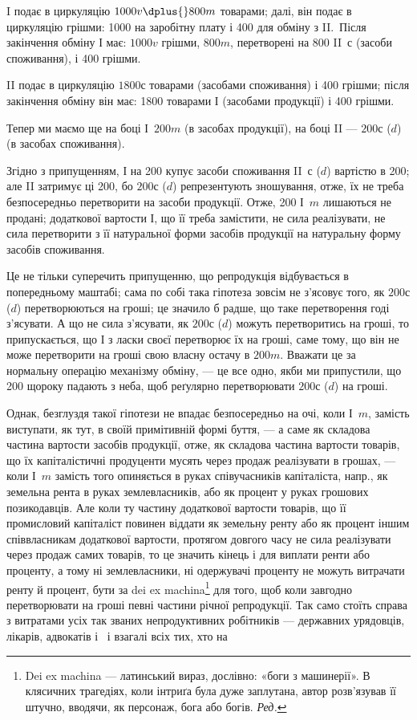 
I подає в циркуляцію $1000 v \dplus{} 800 m$ товарами; далі, він подає
в циркуляцію грішми: 1000 на заробітну плату і 400
для обміну з II.~Після закінчення обміну І має: $1000 v$ грішми, $800 m$,
перетворені на 800 II~$с$ (засоби споживання), і 400 грішми.

II подає в циркуляцію $1800 с$ товарами (засобами споживання) і
400 грішми; після закінчення обміну він має: 1800 товарами І
(засобами продукції) і 400 грішми.

Тепер ми маємо ще на боці І~$200 m$ (в засобах продукції), на боці
II — $200 с$ ($d$) (в засобах споживання).

Згідно з припущенням, І на 200 купує засоби споживання
II~$с$ ($d$) вартістю в 200; але II затримує ці 200, бо $200 с$ ($d$)
репрезентують зношування, отже, їх не треба безпосередньо перетворити
на засоби продукції. Отже, 200 І~$m$ лишаються не продані;
 додаткової вартости І, що її треба замістити, не сила реалізувати, не
сила перетворити з її натуральної форми засобів продукції на натуральну
форму засобів споживання.

Це не тільки суперечить припущенню, що репродукція відбувається
в попередньому маштабі; сама по собі така гіпотеза зовсім не з’ясовує
того, як $200 с$ ($d$) перетворюються на гроші; це значило б радше, що
таке перетворення годі з’ясувати. А що не сила з’ясувати, як $200 с$ ($d$)
можуть перетворитись на гроші, то припускається, що І з ласки своєї
перетворює їх на гроші, саме тому, що він не може перетворити на гроші
свою власну остачу в $200 m$. Вважати це за нормальну операцію механізму
обміну, — це все одно, якби ми припустили, що 200
щороку падають з неба, щоб реґулярно перетворювати $200 с$ ($d$) на гроші.

Однак, безглуздя такої гіпотези не впадає безпосередньо на очі, коли І~$m$,
замість виступати, як тут, в своїй примітивній формі буття, — а саме як
складова частина вартости засобів продукції, отже, як складова частина
вартости товарів, що їх капіталістичні продуценти мусять через продаж
реалізувати в грошах, — коли І~$m$ замість того опиняється в руках співучасників
капіталіста, напр., як земельна рента в руках землевласників,
або як процент у руках грошових позикодавців. Але коли ту частину додаткової
вартости товарів, що її промисловий капіталіст повинен віддати
як земельну ренту або як процент іншим співвласникам додаткової вартости,
протягом довгого часу не сила реалізувати через продаж самих
товарів, то це значить кінець і для виплати ренти або проценту, а тому
ні землевласники, ні одержувачі проценту не можуть витрачати ренту й
процент, бути за dei ex machina\footnote*{
Dei ex machina — латинський вираз, дослівно: «боги з машинерії». В клясичних
трагедіях, коли інтриґа була дуже заплутана, автор розв’язував її штучно,
вводячи, як персонаж, бога або богів. \emph{Ред.}
} для того, щоб коли завгодно перетворювати
на гроші певні частини річної репродукції. Так само стоїть
справа з витратами усіх так званих непродуктивних робітників — державних
урядовців, лікарів, адвокатів і~ і взагалі всіх тих, хто на
\parbreak{}  %
